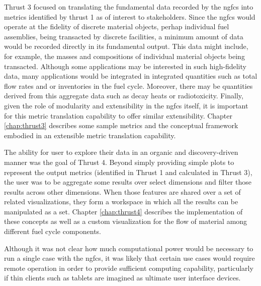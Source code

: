 Thrust 3 focused on translating the fundamental data recorded by the
\gls{ngfcs} into metrics identified by thrust 1 as of interest to
stakeholders.  Since the \gls{ngfcs} would operate at the fidelity of discrete
material objects, perhap individual fuel assemblies, being transacted by
discrete facilities, a minimum amount of data would be recorded directly in
its fundamental output.  This data might include, for example, the masses and
compositions of individual material objects being transacted.  Although some
applications may be interested in such high-fidelity data, many applications
would be integrated in integrated quantities such as total flow rates and or
inventories in the fuel cycle.  Moreover, there may be quantities derived from
this aggregate data such as decay heats or radiotoxicity.  Finally, given the
role of modularity and extensibility in the \gls{ngfcs} itself, it is
important for this metric translation capability to offer similar
extensibility.  Chapter \ref{chap:thrust3} describes some sample metrics and
the conceptual framework embodied in an extensible metric translation
capability.

The ability for user to explore their data in an organic and discovery-driven
manner was the goal of Thrust 4.  Beyond simply providing simple plots to
represent the output metrics (identified in Thrust 1 and calculated in Thrust
3), the user was to be aggregate some results over select dimensions and
filter those results across other dimensions.  When those features are shared
over a set of related visualizations, they form a workspace in which all the
results can be manipulated as a set.  Chapter \ref{chap:thrust4} describes the
implementation of these concepts as well as a custom visualization for the
flow of material among different fuel cycle components.

Although it was not clear how much computational power would be necessary to
run a single case with the \gls{ngfcs}, it was likely that certain use cases
would require remote operation in order to provide sufficient computing
capability, particularly if thin clients such as tablets are imagined as
ultimate user interface devices.  
